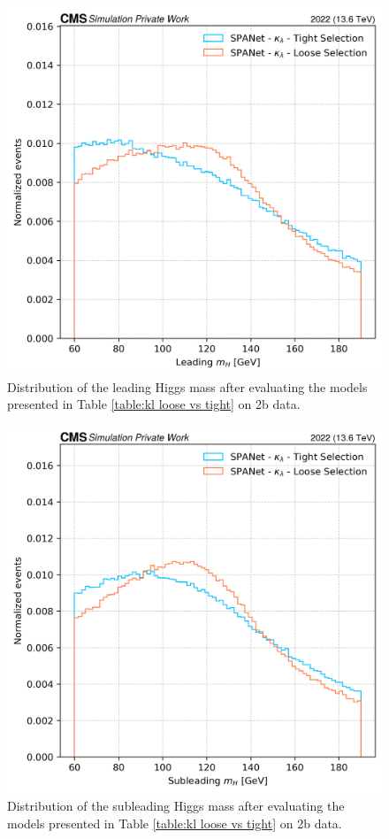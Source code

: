 \begin{figure}[hbt]
    \centering
    \includegraphics[width=0.6\linewidth]{Images/6.Improving/kappa lambda/leading h mass sculp.png}
    \caption{Distribution of the leading Higgs mass after evaluating the models presented in Table \ref{table:kl loose vs tight} on 2b data.}
    \label{fig: leading H mass dist}
\end{figure}

\begin{figure}[hbt]
    \centering
    \includegraphics[width=0.6\linewidth]{Images/6.Improving/kappa lambda/sub leading H mass sculpt.png}
    \caption{Distribution of the subleading Higgs mass after evaluating the models presented in Table \ref{table:kl loose vs tight} on 2b data.}
    \label{fig: subleading H mass dist}
\end{figure}

\newpage

